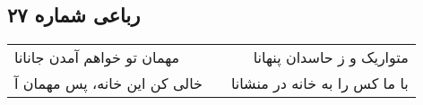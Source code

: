 \begin{center}
\section*{رباعی شماره ۲۷}
\label{sec:sh027}
\begin{longtable}{l p{0.5cm} r}
مهمان تو خواهم آمدن جانانا
&&
متواریک و ز حاسدان پنهانا
\\
خالی کن این خانه، پس مهمان آ
&&
با ما کس را به خانه در منشانا
\\
\end{longtable}
\end{center}
